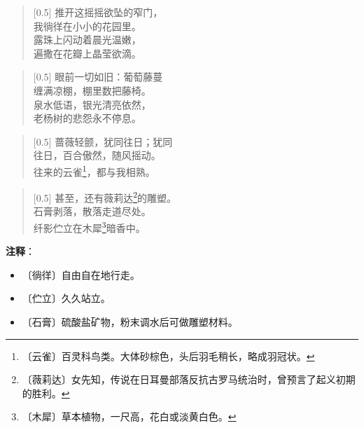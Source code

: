 \documentclass[12pt,UTF-8,openany]{ctexbook}
\begin{document}
\begin{normalsize}
    
    \begin{verse}[0.5\linewidth]
        推开这摇摇欲坠的窄门， \\
        我徜徉在小小的花园里。 \\
        露珠上闪动着晨光温嫩， \\
        遍撒在花瓣上晶莹欲滴。
    \end{verse}
    
    
    \begin{verse}[0.5\linewidth]
        眼前一切如旧：葡萄藤蔓 \\
        缠满凉棚，棚里数把藤椅。 \\
        泉水低语，银光清亮依然， \\
        老杨树的悲怨永不停息。
    \end{verse}
    
    
    \begin{verse}[0.5\linewidth]
        蔷薇轻颤，犹同往日；犹同 \\
        往日，百合傲然，随风摇动。 \\
        往来的云雀\footnote{〔云雀〕百灵科鸟类。大体砂棕色，头后羽毛稍长，略成羽冠状。}，都与我相熟。
    \end{verse}
    
    
    \begin{verse}[0.5\linewidth]
        甚至，还有薇莉达\footnote{〔薇莉达〕女先知，传说在日耳曼部落反抗古罗马统治时，曾预言了起义初期的胜利。}的雕塑。 \\
        石膏剥落，散落走道尽处。 \\
        纤影伫立在木犀\footnote{〔木犀〕草本植物，一尺高，花白或淡黄白色。}暗香中。
    \end{verse}
    
\end{normalsize}


\newpage

\textbf{注释}：

\vspace{-1em}

\begin{itemize}
    \setlength\itemsep{-0.2em}
    \item 〔徜徉〕自由自在地行走。
    \item 〔伫立〕久久站立。
    \item 〔石膏〕硫酸盐矿物，粉末调水后可做雕塑材料。
\end{itemize}
\end{document}
